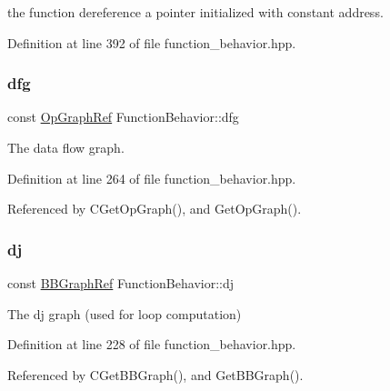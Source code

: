 the function dereference a pointer initialized with constant address. 



Definition at line 392 of file function\+\_\+behavior.\+hpp.

\mbox{\label{classFunctionBehavior_a2d392926b155b2f78a147ae7d62e25a1}} 
\subsubsection{\texorpdfstring{dfg}{dfg}}
{\footnotesize\ttfamily const \hyperlink{op__graph_8hpp_aee97c95c40f791b60c451d9e29c72d39}{Op\+Graph\+Ref} Function\+Behavior\+::dfg\hspace{0.3cm}{\ttfamily [private]}}



The data flow graph. 



Definition at line 264 of file function\+\_\+behavior.\+hpp.



Referenced by C\+Get\+Op\+Graph(), and Get\+Op\+Graph().

\mbox{\label{classFunctionBehavior_a09bdaf73e8044e57b73d2e8f406f3bdb}} 
\subsubsection{\texorpdfstring{dj}{dj}}
{\footnotesize\ttfamily const \hyperlink{basic__block_8hpp_a0e7f233d1b83cad0bfd5aa865f0d3532}{B\+B\+Graph\+Ref} Function\+Behavior\+::dj\hspace{0.3cm}{\ttfamily [private]}}



The dj graph (used for loop computation) 



Definition at line 228 of file function\+\_\+behavior.\+hpp.



Referenced by C\+Get\+B\+B\+Graph(), and Get\+B\+B\+Graph().

\mbox{\label{classFunctionBehavior_ad902d08e8537e2e1ea4a28cbf8e51243}} 
